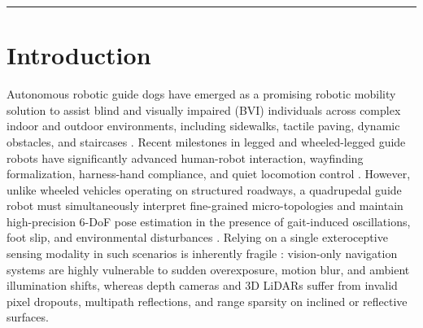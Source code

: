 \documentclass[11pt, a4paper]{article}
\begin{document}
\begin{abstract}
$0.1711$\,m (standard PF) to $0.0877$\,m, matching the stair-tracking accuracy of a globally inflated covariance filter while reducing flat-ground process uncertainty volume by $97.4\%$. To make every claim auditable, we further release a dataset atlas with RGB, metric-depth, dense-annotation and class-colour panels, a stand-alone qualitative clustering comparison, paired non-parametric tests over 20 seeds, CPU latency measurements, and a calibration-label-efficiency curve, all linked to the uploaded source data and code.

\vspace{6pt}
\noindent
\textbf{Keywords:} Reliability-aware multi-view clustering; Physical sensor health; RGB-D terrain perception; Asymmetric sensor degradation; Cluster-to-terrain calibration; Semantic-adaptive particle filter; Robotic guide dog
\end{abstract}

\hrule
\vspace{12pt}

\section{Introduction}
\label{sec:intro}
Autonomous robotic guide dogs have emerged as a promising robotic mobility solution to assist blind and visually impaired (BVI) individuals across complex indoor and outdoor environments, including sidewalks, tactile paving, dynamic obstacles, and staircases \cite{hong2022development, kim2023transforming, cai2024navigating, li2026budd}. Recent milestones in legged and wheeled-legged guide robots have significantly advanced human-robot interaction, wayfinding formalization, harness-hand compliance, and quiet locomotion control \cite{kim2023transforming, cai2024navigating, chen2025bionic, yu2026human, akhdan2024guiding}. However, unlike wheeled vehicles operating on structured roadways, a quadrupedal guide robot \cite{bledt2018cheetah, hwang2023system} must simultaneously interpret fine-grained micro-topologies \cite{chuang2018deep, hwang2026guidenav, bui2026naviformer} and maintain high-precision 6-DoF pose estimation in the presence of gait-induced oscillations, foot slip, and environmental disturbances \cite{miki2022learning, nistico2025muse}. Relying on a single exteroceptive sensing modality in such scenarios is inherently fragile \cite{chen2022multimodal}: vision-only navigation systems \cite{chuang2018deep, hwang2026guidenav} are highly vulnerable to sudden overexposure, motion blur, and ambient illumination shifts, whereas depth cameras and 3D LiDARs suffer from invalid pixel dropouts, multipath reflections, and range sparsity on inclined or reflective surfaces.
\end{document}
